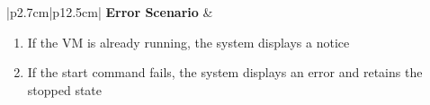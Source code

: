 \begin{table}[H]
\begin{tabular}{|p{2.7cm}|p{12.5cm}|}
        \hline
        \textbf{Error Scenario} & \begin{minipage}[t]{\linewidth}
                                      \begin{enumerate}[topsep=0pt,itemsep=1pt,parsep=0pt,partopsep=0pt]
                                          \item If the VM is already running, the system displays a notice
                                          \item If the start command fails, the system displays an error and retains the
                                                stopped state
                                      \end{enumerate}
                                  \end{minipage} \\
        \hline
    \end{tabular}
    \label{tab:admin-start-vm}
\end{table}
